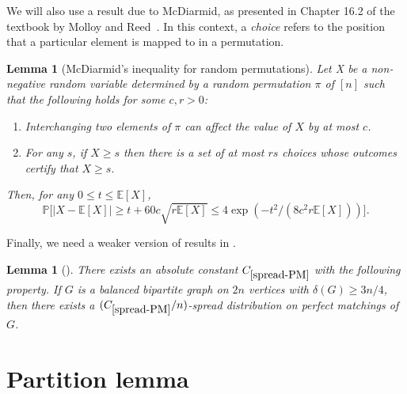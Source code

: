 \documentclass[11pt, letterpaper]{amsart}
\theoremstyle{plain}
\numberwithin{equation}{section}
\newtheorem{lemma}[thm]{Lemma}
\theoremstyle{definition}
\begin{document}
    We will also use a result due to McDiarmid, as presented in Chapter 16.2 of the textbook by Molloy and Reed~\cite{molloy2002graph}. In this context, a \emph{choice} refers to the position that a particular element is mapped to in a permutation.

    \begin{lemma}[McDiarmid's inequality for random permutations]\label{McDiarmid's inequality}
	    Let X be a non-negative random variable determined by a random permutation $\pi$ of $[n]$ such that the following holds for some $c,r>0$:
        \begin{enumerate}
            \item Interchanging two elements of $\pi$ can affect the value of $X$ by at most $c$.
            \item For any $s$, if $X\ge s$ then there is a set of at most $rs$ choices whose outcomes certify that $X\ge s.$
        \end{enumerate}
        Then, for any $0\le t\le \mathbb{E}[X]$,$$\mathbb{P}\big[|X-\mathbb{E}[X]|\ge t+60c\sqrt{r\mathbb{E}[X]}\le 4\exp{(-t^2/(8c^2r\mathbb{E}[X]))}\big].$$
    \end{lemma}

    Finally, we need a weaker version of results in \cite{pham2022toolkit}.
        
    \begin{lemma}[\cite{pham2022toolkit}]\label{spread-PM}
        There exists an absolute constant $C_{\ref{spread-PM}}$ with the following property. If $G$ is a balanced bipartite graph on $2n$ vertices with $\delta(G)\ge 3n/4$, then there exists a $(C_{\ref{spread-PM}}/n)$-spread distribution on perfect matchings of $G$.
    \end{lemma}

    

        


        


    
    
    \section{Partition lemma}\label{partition lemma}
\end{document}
